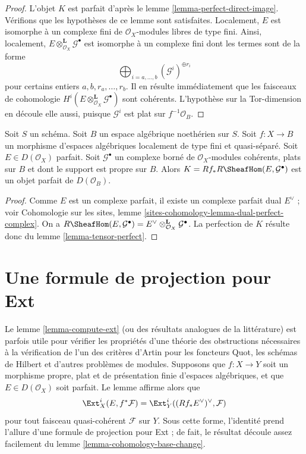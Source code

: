 \begin{proof}
L'objet $K$ est parfait d'apr\`es le lemme \ref{lemma-perfect-direct-image}.
V\'erifions que les hypoth\`eses de ce lemme sont satisfaites. Localement, $E$
est isomorphe \`a un complexe fini de $\mathcal{O}_X$-modules libres de type
fini. Ainsi, localement,
$E\otimes^\mathbf{L}_{\mathcal{O}_X}\mathcal{G}^\bullet$ est isomorphe \`a un
complexe fini dont les termes sont de la forme
$$
\bigoplus\nolimits_{i = a, \ldots, b} (\mathcal{G}^i)^{\oplus r_i}
$$
pour certains entiers $a,b,r_a,\ldots,r_b$. Il en r\'esulte imm\'ediatement que
les faisceaux de cohomologie
$H^i(E\otimes^\mathbf{L}_{\mathcal{O}_X}\mathcal{G}^\bullet)$ sont coh\'erents.
L'hypoth\`ese sur la Tor-dimension en d\'ecoule elle aussi, puisque
$\mathcal{G}^i$ est plat sur $f^{-1}\mathcal{O}_B$.
\end{proof}

\begin{lemma}
\label{lemma-ext-perfect}
Soit $S$ un sch\'ema. Soit $B$ un espace alg\'ebrique noeth\'erien sur $S$.
Soit $f:X\to B$ un morphisme d'espaces alg\'ebriques localement de type fini
et quasi-s\'epar\'e. Soit $E\in D(\mathcal{O}_X)$ parfait. Soit
$\mathcal{G}^\bullet$ un complexe born\'e de $\mathcal{O}_X$-modules coh\'erents,
plats sur $B$ et dont le support est propre sur $B$. Alors
$K=Rf_*R\SheafHom(E,\mathcal{G}^\bullet)$ est un objet parfait de
$D(\mathcal{O}_B)$.
\end{lemma}

\begin{proof}
Comme $E$ est un complexe parfait, il existe un complexe parfait dual
$E^\vee$ ; voir Cohomologie sur les sites, lemme
\ref{sites-cohomology-lemma-dual-perfect-complex}. On a
$R\SheafHom(E,\mathcal{G}^\bullet)=
E^\vee\otimes^\mathbf{L}_{\mathcal{O}_X}\mathcal{G}^\bullet$.
La perfection de $K$ r\'esulte donc du lemme \ref{lemma-tensor-perfect}.
\end{proof}

\section{Une formule de projection pour Ext}
\label{section-ext}

\noindent
Le lemme \ref{lemma-compute-ext} (ou des r\'esultats analogues de la
litt\'erature) est parfois utile pour v\'erifier les propri\'et\'es d'une th\'eorie
des obstructions n\'ecessaires \`a la v\'erification de l'un des crit\`eres d'Artin
pour les foncteurs Quot, les sch\'emas de Hilbert et d'autres probl\`emes de
modules. Supposons que $f:X\to Y$ soit un morphisme propre, plat et de
pr\'esentation finie d'espaces alg\'ebriques, et que
$E\in D(\mathcal{O}_X)$ soit parfait. Le lemme affirme alors que
$$
\Ext^i_X(E, f^*\mathcal{F}) =
\Ext^i_Y((Rf_*E^\vee)^\vee, \mathcal{F})
$$
pour tout faisceau quasi-coh\'erent $\mathcal{F}$ sur $Y$. Sous cette forme,
l'identit\'e prend l'allure d'une formule de projection pour Ext ; de fait, le
r\'esultat d\'ecoule assez facilement du lemme \ref{lemma-cohomology-base-change}.

